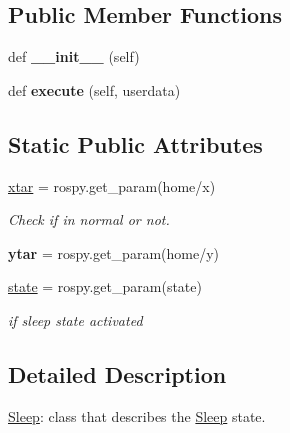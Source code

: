 \subsection*{Public Member Functions}
\begin{DoxyCompactItemize}
\item 
def {\bfseries \+\_\+\+\_\+init\+\_\+\+\_\+} (self)\hypertarget{classPet__behaviours_1_1Sleep_a4c496191e2c51bf2984208d180e1fd99}{}\label{classPet__behaviours_1_1Sleep_a4c496191e2c51bf2984208d180e1fd99}

\item 
def {\bfseries execute} (self, userdata)\hypertarget{classPet__behaviours_1_1Sleep_a952790c46209d96b95cb0c63de329b97}{}\label{classPet__behaviours_1_1Sleep_a952790c46209d96b95cb0c63de329b97}

\end{DoxyCompactItemize}
\subsection*{Static Public Attributes}
\begin{DoxyCompactItemize}
\item 
\hyperlink{classPet__behaviours_1_1Sleep_a643e30c580a0274a40c28847a1c9e445}{xtar} = rospy.\+get\+\_\+param(\textquotesingle{}home/x\textquotesingle{})
\begin{DoxyCompactList}\small\item\em Check if in normal or not. \end{DoxyCompactList}\item 
{\bfseries ytar} = rospy.\+get\+\_\+param(\textquotesingle{}home/y\textquotesingle{})\hypertarget{classPet__behaviours_1_1Sleep_acff6bf9f7c507069469110129bce78fd}{}\label{classPet__behaviours_1_1Sleep_acff6bf9f7c507069469110129bce78fd}

\item 
\hyperlink{classPet__behaviours_1_1Sleep_a896626409cc2d477e99165f69de520de}{state} = rospy.\+get\+\_\+param(\textquotesingle{}state\textquotesingle{})
\begin{DoxyCompactList}\small\item\em if sleep state activated \end{DoxyCompactList}\end{DoxyCompactItemize}


\subsection{Detailed Description}
\hyperlink{classPet__behaviours_1_1Sleep}{Sleep}\+: class that describes the \hyperlink{classPet__behaviours_1_1Sleep}{Sleep} state. 

